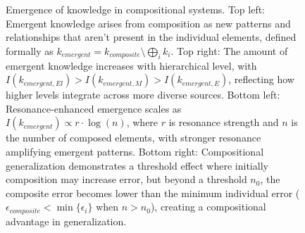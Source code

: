 \begin{figure}[t]
\caption{Emergence of knowledge in compositional systems. Top left: Emergent knowledge arises from composition as new patterns and relationships that aren't present in the individual elements, defined formally as $k_{emergent} = k_{composite} \setminus \bigoplus_{i} k_i$. Top right: The amount of emergent knowledge increases with hierarchical level, with $I(k_{emergent, El}) > I(k_{emergent, M}) > I(k_{emergent, E})$, reflecting how higher levels integrate across more diverse sources. Bottom left: Resonance-enhanced emergence scales as $I(k_{emergent}) \propto r \cdot \log(n)$, where $r$ is resonance strength and $n$ is the number of composed elements, with stronger resonance amplifying emergent patterns. Bottom right: Compositional generalization demonstrates a threshold effect where initially composition may increase error, but beyond a threshold $n_0$, the composite error becomes lower than the minimum individual error ($\epsilon_{composite} < \min\{\epsilon_i\}$ when $n > n_0$), creating a compositional advantage in generalization.}
\label{fig:emergent_knowledge}
\end{figure}